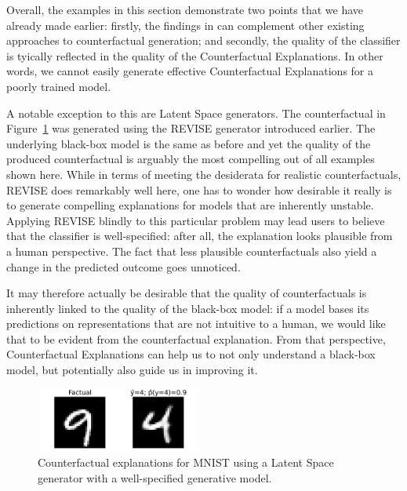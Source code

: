 \documentclass[
  letterpaper,
  DIV=11,
  numbers=noendperiod]{scrartcl}
\begin{document}
Overall, the examples in this section demonstrate two points that we
have already made earlier: firstly, the findings in
\cite{schut2021generating} can complement other existing approaches to
counterfactual generation; and secondly, the quality of the classifier
is tyically reflected in the quality of the Counterfactual Explanations.
In other words, we cannot easily generate effective Counterfactual
Explanations for a poorly trained model.

A notable exception to this are Latent Space generators. The
counterfactual in Figure~\ref{fig-mnist-4to9-latent} was generated using
the REVISE generator introduced earlier. The underlying black-box model
is the same as before and yet the quality of the produced counterfactual
is arguably the most compelling out of all examples shown here. While in
terms of meeting the desiderata for realistic counterfactuals, REVISE
does remarkably well here, one has to wonder how desirable it really is
to generate compelling explanations for models that are inherently
unstable. Applying REVISE blindly to this particular problem may lead
users to believe that the classifier is well-specified: after all, the
explanation looks plausible from a human perspective. The fact that less
plausible counterfactuals also yield a change in the predicted outcome
goes unnoticed.

It may therefore actually be desirable that the quality of
counterfactuals is inherently linked to the quality of the black-box
model: if a model bases its predictions on representations that are not
intuitive to a human, we would like that to be evident from the
counterfactual explanation. From that perspective, Counterfactual
Explanations can help us to not only understand a black-box model, but
potentially also guide us in improving it.

\begin{figure}

{\centering \includegraphics[width=2.16667in,height=0.83333in]{www/mnist_9to4_latent.png}

}

\caption{\label{fig-mnist-4to9-latent}Counterfactual explanations for
MNIST using a Latent Space generator with a well-specified generative
model.}

\end{figure}
\end{document}
